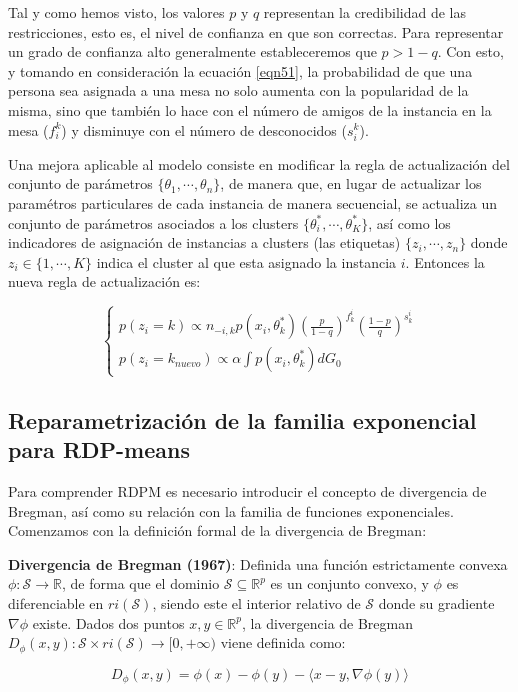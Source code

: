 Tal y como hemos visto, los valores $p$ y $q$ representan la credibilidad de las restricciones, esto es, el nivel de confianza en que son correctas. Para representar un grado de confianza alto generalmente estableceremos que $p > 1 - q$. Con esto, y tomando en consideración la ecuación \ref{eqn51}, la probabilidad de que una persona sea asignada a una mesa no solo aumenta con la popularidad de la misma, sino que también lo hace con el número de amigos de la instancia en la mesa ($f_{i}^k$) y disminuye con el número de desconocidos ($s_{i}^k$).

Una mejora aplicable al modelo consiste en modificar la regla de actualización del conjunto de parámetros $ \{\theta_1, \cdots, \theta_n\}$, de manera que, en lugar de actualizar los paramétros particulares de cada instancia de manera secuencial, se actualiza un conjunto de parámetros asociados a los clusters $\{\theta_i^*, \cdots, \theta_K^*\}$, así como los indicadores de asignación de instancias a clusters (las etiquetas) $\{z_i, \cdots, z_n\}$ donde $z_i\in \{1, \cdots, K\}$ indica el cluster al que esta asignado la instancia $i$. Entonces la nueva regla de actualización es:

\begin{equation}
\begin{cases}
p(z_i = k) \varpropto n_{-i,k}p(x_i,\theta_k^*)\left(\frac{p}{1-q}\right)^{f_{k}^i} \left(\frac{1-p}{q}\right)^{s_{k}^i} \\
p(z_i = k_{nuevo}) \varpropto \alpha \int p(x_i,\theta_k^*)dG_0
\end{cases}
\label{eqn53}
\end{equation}

\subsection{Reparametrización de la familia exponencial para RDP-means}

Para comprender \acf{RDPM} es necesario introducir el concepto de divergencia de Bregman, así como su relación con la familia de funciones exponenciales. Comenzamos con la definición formal de la divergencia de Bregman:

\begin{definicion}
	
	\textbf{Divergencia de Bregman (1967)}: Definida una función estrictamente convexa $\phi: \mathcal{S} \rightarrow \mathbb{R}$, de forma que el dominio $\mathcal{S} \subseteq \mathbb{R}^p$ es un conjunto convexo, y $\phi$ es diferenciable en $ri(\mathcal{S})$, siendo este el interior relativo de $\mathcal{S}$ donde su gradiente $\nabla \phi$ existe. Dados dos puntos $x,y \in \mathbb{R}^p$, la divergencia de Bregman $D_{\phi}(x,y): \mathcal{S} \times ri(\mathcal{S}) \rightarrow [0, + \infty)$ viene definida como: \cite{RDPM:2015}
	
	$$ D_{\phi}(x,y) = \phi(x) - \phi(y) - \langle x - y, \nabla \phi(y)  \rangle $$
	
\end{definicion}

